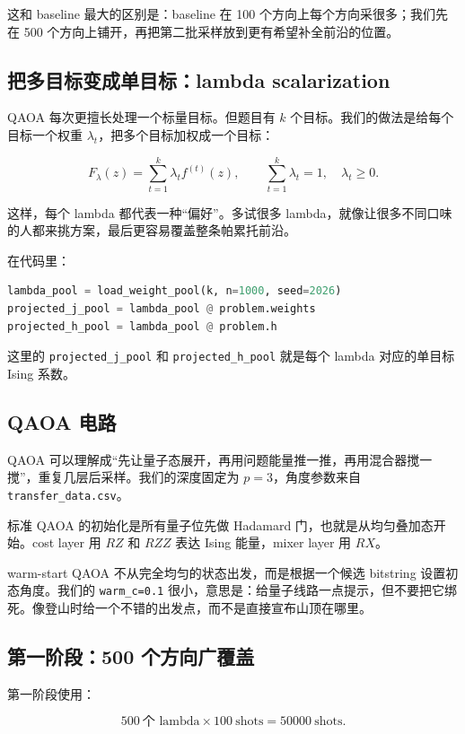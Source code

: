 \documentclass[UTF8,zihao=-4]{ctexart}
\newcommand{\code}[1]{\texttt{#1}}
\begin{document}
这和 baseline 最大的区别是：baseline 在 100 个方向上每个方向采很多；我们先在 500 个方向上铺开，再把第二批采样放到更有希望补全前沿的位置。

\subsection{把多目标变成单目标：lambda scalarization}

QAOA 每次更擅长处理一个标量目标。但题目有 \(k\) 个目标。我们的做法是给每个目标一个权重 \(\lambda_t\)，把多个目标加权成一个目标：

\[
F_\lambda(z)=\sum_{t=1}^{k}\lambda_t f^{(t)}(z),
\qquad
\sum_{t=1}^{k}\lambda_t=1,\quad \lambda_t\ge 0.
\]

这样，每个 lambda 都代表一种“偏好”。多试很多 lambda，就像让很多不同口味的人都来挑方案，最后更容易覆盖整条帕累托前沿。

在代码里：

\begin{lstlisting}[language=Python]
lambda_pool = load_weight_pool(k, n=1000, seed=2026)
projected_j_pool = lambda_pool @ problem.weights
projected_h_pool = lambda_pool @ problem.h
\end{lstlisting}

这里的 \code{projected\_j\_pool} 和 \code{projected\_h\_pool} 就是每个 lambda 对应的单目标 Ising 系数。

\subsection{QAOA 电路}

QAOA 可以理解成“先让量子态展开，再用问题能量推一推，再用混合器搅一搅”，重复几层后采样。我们的深度固定为 \(p=3\)，角度参数来自 \code{transfer\_data.csv}。

标准 QAOA 的初始化是所有量子位先做 Hadamard 门，也就是从均匀叠加态开始。cost layer 用 \(RZ\) 和 \(RZZ\) 表达 Ising 能量，mixer layer 用 \(RX\)。

warm-start QAOA 不从完全均匀的状态出发，而是根据一个候选 bitstring 设置初态角度。我们的 \code{warm\_c=0.1} 很小，意思是：给量子线路一点提示，但不要把它绑死。像登山时给一个不错的出发点，而不是直接宣布山顶在哪里。

\subsection{第一阶段：500 个方向广覆盖}

第一阶段使用：

\[
500\ \text{个 lambda}\times 100\ \text{shots}=50000\ \text{shots}.
\]
\end{document}
